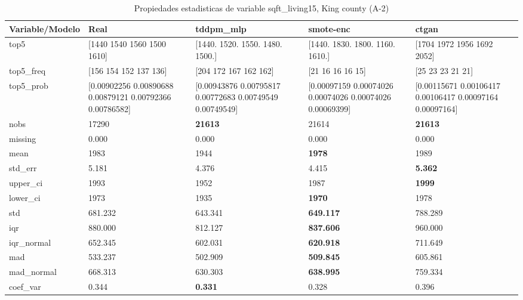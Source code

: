 \begin{table}[H]
\centering
\fontsize{8}{14}\selectfont
\caption{Propiedades  estadisticas de variable sqft\_living15, King county (A-2)}
\label{table-stats-king county-a-2-sqft_living15}
\begin{tabular}{|l|m{10em}|m{10em}|m{10em}|m{10em}|}
\hline
 \rowcolor[gray]{0.8}
Variable/Modelo & Real & tddpm\_mlp & smote-enc & ctgan \\
\hline top5 & [1440 1540 1560 1500 1610] & [1440. 1520. 1550. 1480. 1500.] & [1440. 1830. 1800. 1160. 1610.] & [1704 1972 1956 1692 2052] \\
\hline top5\_freq & [156 154 152 137 136] & [204 172 167 162 162] & [21 16 16 16 15] & [25 23 23 21 21] \\
\hline top5\_prob & [0.00902256 0.00890688 0.00879121 0.00792366 0.00786582] & [0.00943876 0.00795817 0.00772683 0.00749549 0.00749549] & [0.00097159 0.00074026 0.00074026 0.00074026 0.00069399] & [0.00115671 0.00106417 0.00106417 0.00097164 0.00097164] \\
\hline nobs & 17290 & \bfseries 21613 & \cellcolor[rgb]{0.9, 0.54, 0.52} 21614 & \bfseries 21613 \\
\hline missing & 0.000 & 0.000 & 0.000 & 0.000 \\
\hline mean & 1983 & \cellcolor[rgb]{0.9, 0.54, 0.52} 1944 & \bfseries 1978 & 1989 \\
\hline std\_err & 5.181 & \cellcolor[rgb]{0.9, 0.54, 0.52} 4.376 & 4.415 & \bfseries 5.362 \\
\hline upper\_ci & 1993 & \cellcolor[rgb]{0.9, 0.54, 0.52} 1952 & 1987 & \bfseries 1999 \\
\hline lower\_ci & 1973 & \cellcolor[rgb]{0.9, 0.54, 0.52} 1935 & \bfseries 1970 & 1978 \\
\hline std & 681.232 & 643.341 & \bfseries 649.117 & \cellcolor[rgb]{0.9, 0.54, 0.52} 788.289 \\
\hline iqr & 880.000 & 812.127 & \bfseries 837.606 & \cellcolor[rgb]{0.9, 0.54, 0.52} 960.000 \\
\hline iqr\_normal & 652.345 & 602.031 & \bfseries 620.918 & \cellcolor[rgb]{0.9, 0.54, 0.52} 711.649 \\
\hline mad & 533.237 & 502.909 & \bfseries 509.845 & \cellcolor[rgb]{0.9, 0.54, 0.52} 605.861 \\
\hline mad\_normal & 668.313 & 630.303 & \bfseries 638.995 & \cellcolor[rgb]{0.9, 0.54, 0.52} 759.334 \\
\hline coef\_var & 0.344 & \bfseries 0.331 & 0.328 & \cellcolor[rgb]{0.9, 0.54, 0.52} 0.396 \\

\end{tabular}
\end{table}
